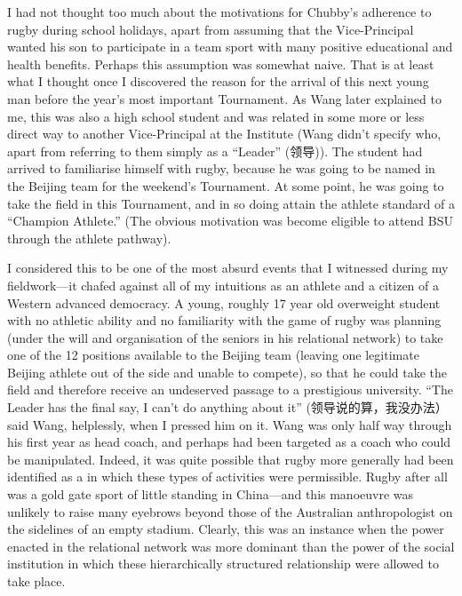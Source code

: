   I had not thought too much about the motivations for Chubby's adherence to rugby during school holidays, apart from assuming that the Vice-Principal wanted his son to participate in a team sport with many positive educational and health benefits.  Perhaps this assumption was somewhat naive.  That is at least what I thought once I discovered the reason for the arrival of this next young man before the year's most important Tournament.  As Wang later explained to me, this was also a high school student and was related in some more or less direct way to another Vice-Principal at the Institute (Wang didn't specify who, apart from referring to them simply as a ``Leader'' (领导)).  The student had arrived to familiarise himself with rugby, because he was going to be named in the Beijing team for the weekend's Tournament.  At some point, he was going to take the field in this Tournament, and in so doing attain the athlete standard of a ``Champion Athlete.''  (The obvious motivation was become eligible to attend BSU through the athlete pathway).

  I considered this to be one of the most absurd events that I witnessed during my fieldwork---it chafed against all of my intuitions as an athlete and a citizen of a Western advanced democracy.  A young, roughly 17 year old overweight student with no athletic ability and no familiarity with the game of rugby was planning (under the will and organisation of the seniors in his relational network) to take one of the 12 positions available to the Beijing team (leaving one legitimate Beijing athlete out of the side and unable to compete), so that he could take the field and therefore receive an undeserved passage to a prestigious university.  ``The Leader has the final say, I can't do anything about it'' (领导说的算，我没办法）said Wang, helplessly, when I pressed him on it.  Wang was only half way through his first year as head coach, and perhaps had been targeted as a coach who could be manipulated.  Indeed, it was quite possible that rugby more generally had been identified as a in which these types of activities were permissible.  Rugby after all was a gold gate sport of little standing in China---and this manoeuvre was unlikely to raise many eyebrows beyond those of the Australian anthropologist on the sidelines of an empty stadium. Clearly, this was an instance when the power enacted in the relational network was more dominant than the power of the social institution in which these hierarchically structured relationship were allowed to take place.

